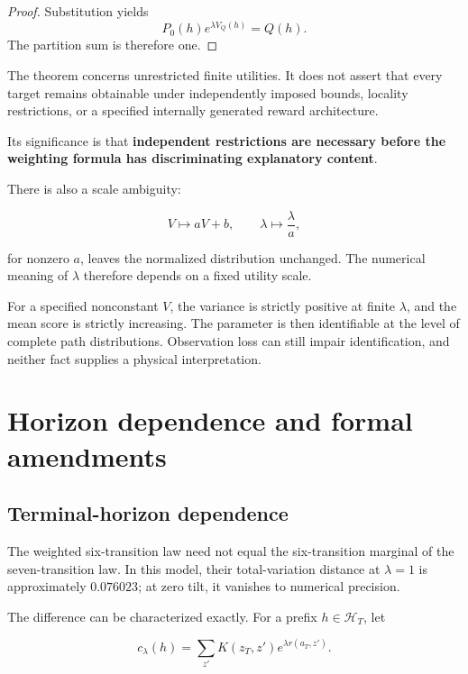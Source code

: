 \documentclass[11pt]{article}
\theoremstyle{remark}
\newcommand{\Hcal}{\mathcal{H}}
\begin{document}
\begin{proof}
Substitution yields
\begin{equation}
P_0(h)e^{\lambda V_Q(h)}=Q(h).
\end{equation}
The partition sum is therefore one.
\end{proof}

The theorem concerns unrestricted finite utilities. It does not assert that every target remains obtainable under independently imposed bounds, locality restrictions, or a specified internally generated reward architecture.

Its significance is that \textbf{independent restrictions are necessary before the weighting formula has discriminating explanatory content}.

There is also a scale ambiguity:

\begin{equation}
V\mapsto aV+b,
\qquad
\lambda\mapsto\frac{\lambda}{a},
\end{equation}

for nonzero \(a\), leaves the normalized distribution unchanged. The numerical meaning of \(\lambda\) therefore depends on a fixed utility scale.

For a specified nonconstant \(V\), the variance is strictly positive at finite \(\lambda\), and the mean score is strictly increasing. The parameter is then identifiable at the level of complete path distributions. Observation loss can still impair identification, and neither fact supplies a physical interpretation.

\section{Horizon dependence and formal amendments}

\subsection{Terminal-horizon dependence}

The weighted six-transition law need not equal the six-transition marginal of the seven-transition law. In this model, their total-variation distance at \(\lambda=1\) is approximately \(0.076023\); at zero tilt, it vanishes to numerical precision.

The difference can be characterized exactly. For a prefix \(h\in\Hcal_T\), let

\begin{equation}
c_\lambda(h)
=
\sum_{z'}
K(z_T,z')e^{\lambda r(a_T,z')}.
\end{equation}
\end{document}
